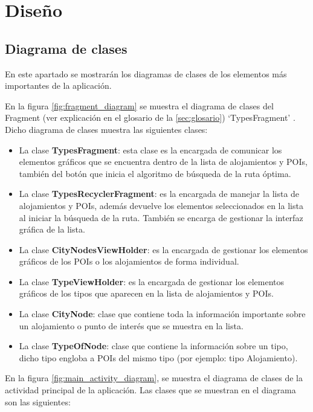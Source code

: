 \section{Diseño}
\subsection[Diagrama de clases]{Diagrama de clases}
En este apartado se mostrarán los diagramas de clases de los elementos más importantes de la aplicación.\newline

En la figura \ref{fig:fragment_diagram} se muestra el diagrama de clases del Fragment (ver explicación en el glosario de la \autoref{sec:glosario}) \enquote*{TypesFragment} . Dicho diagrama de clases muestra las siguientes clases:
\begin{itemize}
	\item La clase \textbf{TypesFragment}: esta clase es la encargada de comunicar los elementos gráficos que se encuentra dentro de la lista de alojamientos y POIs, también del botón que inicia el algoritmo de búsqueda de la ruta óptima.
	\item La clase \textbf{TypesRecyclerFragment}: es la encargada de manejar la lista de alojamientos y POIs, además devuelve los elementos seleccionados en la lista al iniciar la búsqueda de la ruta. También se encarga de gestionar la interfaz gráfica de la lista.
	\item La clase \textbf{CityNodesViewHolder}: es la encargada de gestionar los elementos gráficos de los POIs o los alojamientos de forma individual.
	\item La clase \textbf{TypeViewHolder}: es la encargada de gestionar los elementos gráficos de los tipos que aparecen en la lista de alojamientos y POIs.
	\item La clase \textbf{CityNode}: clase que contiene toda la información importante sobre un alojamiento o punto de interés que se muestra en la lista.
	\item La clase \textbf{TypeOfNode}: clase que contiene la información sobre un tipo, dicho tipo engloba a POIs del mismo tipo (por ejemplo: tipo Alojamiento).
\end{itemize}
\vspace{0.06in}
En la figura  \ref{fig:main_activity_diagram}, se muestra el diagrama de clases de la actividad principal de la aplicación. Las clases que se muestran en el diagrama son las siguientes:
